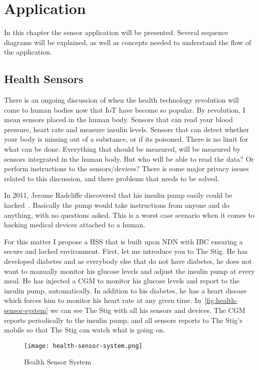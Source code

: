 \chapter{Application}\label{sensor-application}
In this chapter the sensor application will be presented. 
Several sequence diagrams will be explained, as well as concepts needed to understand the flow of the application. 

\section{Health Sensors}
There is an ongoing discussion of when the health technology revolution will come to human bodies now that \gls{IoT} have become so popular.
By revolution, I mean sensors placed in the human body. 
Sensors that can read your blood pressure, heart rate and measure insulin levels.
Sensors that can detect whether your body is missing out of a substance, or if its poisoned. 
There is no limit for what can be done.
Everything that should be measured, will be measured by sensors integrated in the human body.
But who will be able to read the data?
Or perform instructions to the sensors/devices?
There is some major privacy issues related to this discussion, and there problems that needs to be solved.

In 2011, Jerome Radcliffe discovered that his insulin pump easily could be hacked~\cite{radcliffe2011hacking}.
Basically the pump would take instructions from anyone and do anything, with no questions asked. 
This is a worst case scenario when it comes to hacking medical devices attached to a human.

For this matter I propose a \gls{HSS} that is built upon \gls{NDN} with \gls{IBC} ensuring a secure and locked environment.
First, let me introduce you to The Stig. 
He has developed diabetes and as everybody else that do not have diabetes, he does not want to manually monitor his glucose levels and adjust the insulin pump at every meal. 
He has injected a \gls{CGM} to monitor his glucose levels and report to the insulin pump, automatically.
In addition to his diabetes, he has a heart disease which forces him to monitor his heart rate at any given time. 
In~\autoref{fig:health-sensor-system} we can see The Stig with all his sensors and devices. 
The \gls{CGM} reports periodically to the insulin pump, and all sensors reports to The Stig's mobile so that The Stig can watch what is going on.

\begin{figure}[ht]
  \centering
  \texttt{[image: health-sensor-system.png]}
  \caption{Health Sensor System}
  \label{fig:health-sensor-system}
\end{figure}

